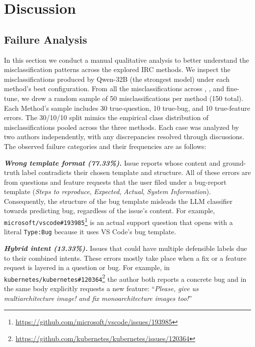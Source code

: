 
\section{Discussion}
\label{sec:discussion}

\subsection{Failure Analysis}
\label{sec:disc-failures}

In this section we conduct a manual qualitative analysis to better understand the misclassification patterns across the explored IRC methods. We inspect the misclassifications produced by Qwen-32B (the strongest model) under each method's best configuration. From all the misclassifications across \ragtag, \bragtag, and fine-tune, we drew a random sample of 50 misclassifications per method (150 total). Each Method's sample includes 30 true-question, 10 true-bug, and 10 true-feature errors. The 30/10/10 split mimics the empirical class distribution of misclassifications pooled across the three methods. Each case was analyzed by two authors independently, with any discrepancies resolved through discussions. The observed failure categories and their frequencies are as follows:

\textbf{\textit{Wrong template format (77.33\%).}} Issue reports whose content and ground-truth label contradicts their chosen template and structure. All of these errors are from questions and feature requests that the user filed under a bug-report template (\textit{Steps to reproduce}, \textit{Expected}, \textit{Actual}, \textit{System Information}). Consequently, the structure of the bug template misleads the LLM classifier towards predicting bug, regardless of the issue's content. For example, \texttt{microsoft/vscode\#193985}\footnote{\url{https://github.com/microsoft/vscode/issues/193985}} is an actual support question that opens with a literal \texttt{Type:Bug} because it uses VS Code's bug template.

\textbf{\textit{Hybrid intent (13.33\%).}} Issues that could have multiple defensible labels due to their combined intents. These errors mostly take place when a fix or a feature request is layered in a question or bug. For example, in \texttt{kubernetes/kubernetes\#120364}\footnote{\url{https://github.com/kubernetes/kubernetes/issues/120364}} the author both reports a concrete bug and in the same body explicitly requests a new feature: ``\textit{Please, give us multiarchitecture image! and fix monoarchitecture images too!}''

